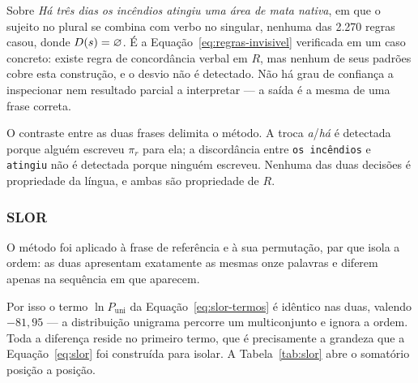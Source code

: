 Sobre \emph{Há três dias os incêndios atingiu uma área de mata nativa}, em que o sujeito no
plural se combina com verbo no singular, nenhuma das 2.270 regras casou, donde
$D(s) = \varnothing$. É a Equação~\ref{eq:regras-invisivel} verificada em um caso
concreto: existe regra de concordância verbal em $R$, mas nenhum de seus padrões cobre esta
construção, e o desvio não é detectado. Não há grau de confiança a inspecionar nem resultado
parcial a interpretar --- a saída é a mesma de uma frase correta.

O contraste entre as duas frases delimita o método. A troca \emph{a}/\emph{há} é detectada
porque alguém escreveu $\pi_r$ para ela; a discordância entre \texttt{os incêndios} e
\texttt{atingiu} não é detectada porque ninguém escreveu. Nenhuma das duas decisões é
propriedade da língua, e ambas são propriedade de $R$.

\subsubsection{SLOR}
\label{res:slor}

O método foi aplicado à frase de referência e à sua permutação, par que isola a ordem: as duas
apresentam exatamente as mesmas onze palavras e diferem apenas na sequência em que aparecem.

Por isso o termo $\ln P_{\mathrm{uni}}$ da Equação~\ref{eq:slor-termos} é idêntico nas duas,
valendo $-81{,}95$ --- a distribuição unigrama percorre um multiconjunto e ignora a ordem.
Toda a diferença reside no primeiro termo, que é precisamente a grandeza que a
Equação~\ref{eq:slor} foi construída para isolar. A Tabela~\ref{tab:slor} abre o somatório
posição a posição.

